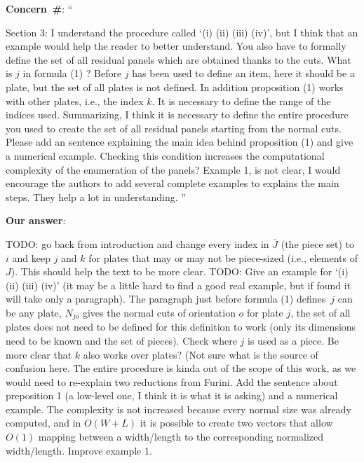 \documentclass[smallextended]{svjour3}       %
\makeatletter
\newcommand\gobblepars{%
    \@ifnextchar\par%
        {\expandafter\gobblepars\@gobble}%
        {}}
\newcounter{concern}
\newenvironment{concern}{%
    \refstepcounter{concern}\par\smallskip\noindent%
    \textbf{Concern~\#\theconcern}: ``\itshape\gobblepars}%
    {\unskip''\smallskip}
\newcounter{answer}
\newenvironment{answer}{%
    \refstepcounter{answer}\par\smallskip\noindent%
    \textbf{Our answer}: \gobblepars}%
    {\unskip\bigskip}
\makeatother
\begin{document}
\begin{concern}
Section 3: I understand the procedure called `(i) (ii) (iii) (iv)', but I think that an example would help the reader to better understand. You also have to formally define the set of all residual panels which are obtained thanks to the cuts. What is \(j\) in formula (1) ? Before \(j\) has been used to define an item, here it should be a plate, but the set of all plates is not defined. In addition proposition (1) works with other plates, i.e., the index \(k\). It is necessary to define the range of the indices used. Summarizing, I think it is necessary to define the entire procedure you used to create the set of all residual panels starting from the normal cuts. Please add an sentence explaining the main idea behind proposition (1) and give a numerical example. Checking this condition increases the computational complexity of the enumeration of the panels? Example 1, is not clear, I would encourage the authors to add several complete examples to explains the main steps. They help a lot in understanding.\label{con:sec3_concerns}
\end{concern}
\begin{answer}
TODO: go back from introduction and change every index in \(\bar{J}\) (the piece set) to \(i\) and keep \(j\) and \(k\) for plates that may or may not be piece-sized (i.e., elements of \(J\)). This should help the text to be more clear.
TODO: Give an example for `(i) (ii) (iii) (iv)' (it may be a little hard to find a good real example, but if found it will take only a paragraph). The paragraph just before formula (1) defines~\(j\) can be any plate, \(N_{jo}\) gives the normal cuts of orientation \(o\) for plate \(j\), the set of all plates does not need to be defined for this definition to work (only its dimensions need to be known and the set of pieces). Check where \(j\) is used as a piece. Be more clear that \(k\) also works over plates? (Not sure what is the source of confusion here. The entire procedure is kinda out of the scope of this work, as we would need to re-explain two reductions from Furini. Add the sentence about preposition 1 (a low-level one, I think it is what it is asking) and a numerical example. The complexity is not increased because every normal size was already computed, and in \(O(W + L)\) it is possible to create two vectors that allow \(O(1)\) mapping between a width/length to the corresponding normalized width/length. Improve example 1.
\end{answer}
\end{document}
